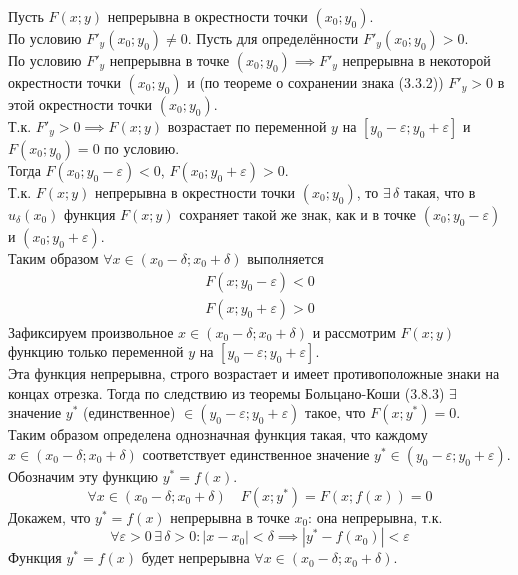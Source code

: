\documentclass[12pt]{article}
\begin{document}
    \begin{adjustwidth}{1.5em}{1.5em}
        Пусть $F(x; y)$ непрерывна в окрестности точки $(x_0; y_0)$.\\
        По условию $F'_y(x_0; y_0) \ne 0$. Пусть для определённости $F'_y(x_0; y_0) > 0$.\\
        По условию $F'_y$ непрерывна в точке $(x_0; y_0) \implies F'_y$ непрерывна в некоторой окрестности точки $(x_0; y_0)$ и (по теореме о сохранении знака (3.3.2)) $F'_y > 0$ в этой окрестности точки $(x_0; y_0)$.\\
        Т.к. $F'_y > 0 \implies F(x; y)$ возрастает по переменной $y$ на $[y_0 - \varepsilon; y_0 + \varepsilon]$ и $F(x_0; y_0) = 0$ по условию.\\
        Тогда $F(x_0; y_0 - \varepsilon) < 0$, $F(x_0; y_0 + \varepsilon) > 0$.\\
        Т.к. $F(x;y)$ непрерывна в окрестности точки $(x_0; y_0)$, то $\exists\, \delta$ такая, что в $u_\delta(x_0)$ функция $F(x; y)$ сохраняет такой же знак, как и в точке $(x_0; y_0 - \varepsilon)$ и $(x_0; y_0 + \varepsilon)$.\\
        Таким образом $\forall x \in (x_0 - \delta; x_0 + \delta)$ выполняется
        \begin{align*}
            F(x; y_0 - \varepsilon) < 0\\
            F(x; y_0 + \varepsilon) > 0
        \end{align*}
        Зафиксируем произвольное $x \in (x_0 - \delta; x_0 + \delta)$ и рассмотрим $F(x; y)$ функцию только переменной $y$ на $[ y_0 - \varepsilon; y_0 + \varepsilon ]$.\\
        Эта функция непрерывна, строго возрастает и имеет противоположные знаки на концах отрезка. Тогда по следствию из теоремы Больцано-Коши (3.8.3) $\exists$ значение $y^*$ (единственное) $\in (y_0 - \varepsilon; y_0 + \varepsilon)$ такое, что $F(x; y^*) = 0$.\\
        Таким образом определена однозначная функция такая, что каждому $x \in (x_0 - \delta; x_0 + \delta)$ соответствует единственное значение $y^* \in (y_0 - \varepsilon; y_0 + \varepsilon)$.\\
        Обозначим эту функцию $y^* = f(x)$.
        \[ \forall x \in (x_0 - \delta; x_0 + \delta) \quad F(x; y^*) = F(x; f(x)) = 0 \]
        Докажем, что $y^* = f(x)$ непрерывна в точке $x_0$: она непрерывна, т.к. 
        \[ \forall \varepsilon > 0\,\exists\,\delta > 0 : |x - x_0| < \delta \implies |y^* - f(x_0)| < \varepsilon \]
        Функция $y^* = f(x)$ будет непрерывна $\forall x \in (x_0 - \delta; x_0 + \delta)$.\\

\end{adjustwidth}
\end{document}
